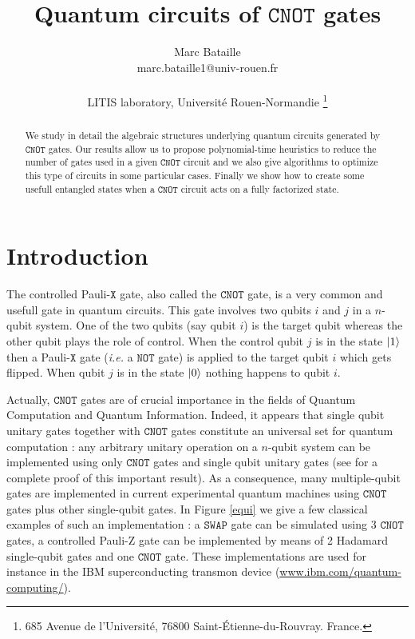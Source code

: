 \documentclass[a4paper,12pt,fleqn]{article}
\newcommand\swap{\mathtt{SWAP}}
\newcommand\cnot{\mathtt{CNOT}}
\newcommand\PauliX{ Pauli-$\mathtt X$ }
\begin{document}
\title{Quantum circuits of $\cnot$ gates }



\author{Marc Bataille \\ marc.bataille1@univ-rouen.fr \\
  \\ LITIS laboratory, Universit\'e Rouen-Normandie \thanks{685 Avenue de l'Universit\'e, 76800 Saint-\'Etienne-du-Rouvray. France.}}

\date{}




  \maketitle
\begin{abstract}
  We study in detail the algebraic structures underlying quantum circuits generated by $\cnot$ gates. Our results allow us to propose polynomial-time heuristics to reduce the number of gates used in a given $\cnot$ circuit  and we also give algorithms to optimize this type of circuits in some particular cases. Finally we show how to create some usefull entangled states when a $\cnot$ circuit acts on a fully factorized state.
\end{abstract}



\section{Introduction}

The controlled \PauliX gate,  also called the $\cnot$ gate, is a very common and usefull gate in quantum circuits. This gate involves two qubits $i$ and $j$ in a $n$-qubit system.
One of the two qubits (say qubit $i$) is the target qubit whereas the other qubit  plays the role of control. When the control qubit $j$ is in the state
$\ket{1}$ then a \PauliX gate (\emph{i.e.} a $\mathtt{NOT}$ gate) is applied to the target qubit $i$ which  gets flipped. 
When qubit $j$ is in the state $\ket{0}$ nothing happens to qubit $i$.  
 

Actually,  $\cnot$ gates are of crucial importance in the fields of Quantum Computation and Quantum Information. Indeed, it appears that single qubit unitary gates together with $\cnot$ gates constitute an universal set for quantum computation :  any arbitrary unitary operation on a $n$-qubit system can be implemented using only $\cnot$ gates and single qubit unitary gates (see \cite[Section 4.5.2]{NCI2011}  for a complete proof of this important result). As a consequence, many multiple-qubit gates are implemented in current experimental quantum machines using $\cnot$ gates plus other single-qubit gates. In Figure \ref{equi} we give a few classical examples of such an implementation : a $\swap$ gate can be simulated using 3 $\cnot$ gates, a controlled Pauli-Z gate can be implemented by means of 2 Hadamard single-qubit gates and one $\cnot$ gate. These implementations are used for instance in the IBM superconducting transmon device  (\url{www.ibm.com/quantum-computing/}).\medskip
\end{document}

